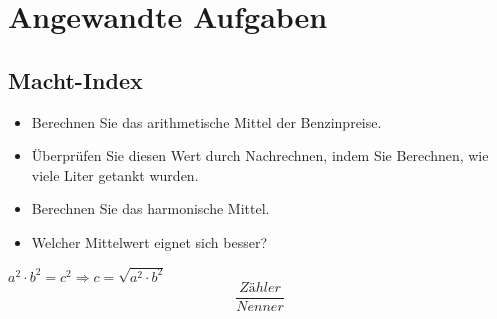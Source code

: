\documentclass[11pt, twocolumn, a4paper]{scrartcl}
\begin{document}
\onecolumn
\section{Angewandte Aufgaben}
\subsection{Macht-Index}



\begin{itemize}
\item Berechnen Sie das arithmetische Mittel der Benzinpreise.
\item Überprüfen Sie diesen Wert durch Nachrechnen, indem Sie Berechnen, wie viele Liter getankt wurden.
\item Berechnen Sie das harmonische Mittel.
\item Welcher Mittelwert eignet sich besser?
\end{itemize}
$a^2 \cdot b^2 = c^2 \Rightarrow c=\sqrt{a^2 \cdot b^2}$
\begin{equation}
\label{eq:1.8.7}
\frac{Zähler}{Nenner}
\end{equation}


\end{document}
